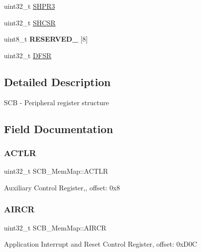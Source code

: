\begin{DoxyCompactItemize}
\item 
uint32\+\_\+t \hyperlink{struct_s_c_b___mem_map_a8ac3a3b8dd23fb279640b98a95fb796a}{S\+H\+P\+R3}
\item 
uint32\+\_\+t \hyperlink{struct_s_c_b___mem_map_ae2b73d4b9744b878527466ec57dbfdb7}{S\+H\+C\+SR}
\item 
\mbox{\label{struct_s_c_b___mem_map_ada5d25c6c4f20fabcc3bb03db9bee4dd}} 
uint8\+\_\+t {\bfseries R\+E\+S\+E\+R\+V\+E\+D\+\_} \mbox{[}8\mbox{]}
\item 
uint32\+\_\+t \hyperlink{struct_s_c_b___mem_map_af178d6003a18eb7452c51edcec14ec5d}{D\+F\+SR}
\end{DoxyCompactItemize}


\subsection{Detailed Description}
S\+CB -\/ Peripheral register structure 

\subsection{Field Documentation}
\mbox{\label{struct_s_c_b___mem_map_a474a33074611146734690e48ed41282e}} 
\subsubsection{\texorpdfstring{A\+C\+T\+LR}{ACTLR}}
{\footnotesize\ttfamily uint32\+\_\+t S\+C\+B\+\_\+\+Mem\+Map\+::\+A\+C\+T\+LR}

Auxiliary Control Register,, offset\+: 0x8 \mbox{\label{struct_s_c_b___mem_map_a3f874ca1c6e17ae4beadac22e8ec17ec}} 
\subsubsection{\texorpdfstring{A\+I\+R\+CR}{AIRCR}}
{\footnotesize\ttfamily uint32\+\_\+t S\+C\+B\+\_\+\+Mem\+Map\+::\+A\+I\+R\+CR}

Application Interrupt and Reset Control Register, offset\+: 0x\+D0C \mbox{\label{struct_s_c_b___mem_map_aa6e957027d8c505047cd58101bb784aa}} 
